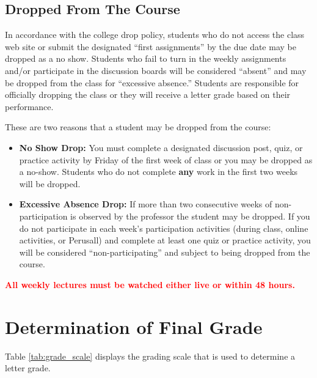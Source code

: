 \documentclass[11pt,]{article}
\begin{document}
\hypertarget{dropped-from-the-course}{%
\subsection{Dropped From The Course}\label{dropped-from-the-course}}

In accordance with the college drop policy, students who do not access
the class web site or submit the designated ``first assignments'' by the
due date may be dropped as a no show. Students who fail to turn in the
weekly assignments and/or participate in the discussion boards will be
considered ``absent'' and may be dropped from the class for ``excessive
absence.'' Students are responsible for officially dropping the class or
they will receive a letter grade based on their performance.

These are two reasons that a student may be dropped from the course:

\begin{itemize}
\item
  \textbf{No Show Drop:} You must complete a designated discussion post,
  quiz, or practice activity by Friday of the first week of class or you
  may be dropped as a no-show. Students who do not complete \textbf{any}
  work in the first two weeks will be dropped.
\item
  \textbf{Excessive Absence Drop:} If more than two consecutive weeks of
  non-participation is observed by the professor the student may be
  dropped. If you do not participate in each week's participation
  activities (during class, online activities, or Perusall) and complete
  at least one quiz or practice activity, you will be considered
  ``non-participating'' and subject to being dropped from the course.
\end{itemize}

\textcolor{red}{\bf{All weekly lectures must be watched either live or within 48 hours.}}

\hypertarget{determination-of-final-grade}{%
\section{Determination of Final
Grade}\label{determination-of-final-grade}}

Table \ref{tab:grade_scale} displays the grading scale that is used to
determine a letter grade.

\renewcommand{\arraystretch}{1.5}
\end{document}
